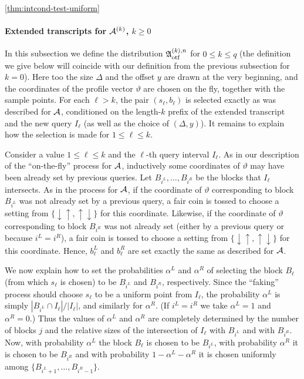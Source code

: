 \begin{proofof}{\cref{thm:intcond-test-uniform}}
\paragraph{Extended transcripts for $\mathcal{A}^{(k)}$, $k\geq 0$}
\label{subsubsec:Ext:trans:Algo:k}
In this subsection we define the
distribution $\mathfrak{A}^{(k),n}_{\rm otf}$ for $0 \leq k \leq q$ (the
definition we give below will coincide with our definition from the
previous subsection for $k=0$).
Here too the size $\Delta$ and the offset $y$ are drawn at the very beginning, and
the coordinates of the profile vector $\vartheta$ are chosen on the fly, together with the
sample points.
For each $\ell > k$, the pair $(s_\ell,b_\ell)$ is selected exactly as was described for $\mathcal{A}$, conditioned on the length-$k$ prefix of the extended transcript and the new
query $I_\ell$ (as well as the choice of $(\Delta,y)$).
It remains to explain how the selection is made for $1 \leq \ell \leq k$.

Consider a value $1 \leq \ell \leq k$ and the $\ell$-th
query interval $I_\ell$.
As in our description of the ``on-the-fly'' process
for $\mathcal{A}$, inductively some coordinates of $\vartheta$ may have been already
set by previous queries.
Let $B_{i^L},\dots,B_{i^R}$ be the blocks that $I_\ell$ intersects.
As in the process  for $\mathcal{A}$,
if the coordinate of $\vartheta$ corresponding to block $B_{i^L}$ was
not already set by a previous query, a fair
coin is tossed to choose a
setting from $\{\downarrow\uparrow,\uparrow\downarrow\}$ for this coordinate.
Likewise, if the coordinate of $\vartheta$ corresponding to block $B_{i^R}$
was not already set (either by a previous query or because $i^L=i^R$), a fair
coin is tossed to choose a
setting from $\{\downarrow\uparrow,\uparrow\downarrow\}$ for this coordinate.
Hence, $b^L_\ell$ and $b^R_\ell$ are set exactly the same as described for
$\mathcal{A}$.

We now explain how to set the probabilities $\alpha^L$ and $\alpha^R$
of selecting the block $B_\ell$ (from which $s_\ell$ is chosen) to be $B_{i^L}$ and
$B_{i^R}$, respectively.
Since the ``faking'' process  should choose $s_\ell$ to be
a uniform point from $I_\ell$, the probability $\alpha^L$ is simply
$|B_{i^L} \cap I_\ell|/|I_\ell|$, and similarly for $\alpha^R$.
(If $i^L=i^R$ we take $\alpha^L=1$ and $\alpha^R=0.$)
Thus the
values of $\alpha^L$ and $\alpha^R$ are completely determined by the
number of blocks $j$ and the relative sizes of the intersection of $I_\ell$
with $B_{i^L}$ and with $B_{i^R}$.
Now, with probability $\alpha^L$ the block $B_\ell$ is chosen to be $B_{i^L}$,
with probability $\alpha^R$ it is chosen to be $B_{i^R}$ and
with probability $1 - \alpha^L - \alpha^R$
it is chosen uniformly among $\{B_{i^L+1},\dots,B_{i^R-1}\}$.


\end{proofof}
